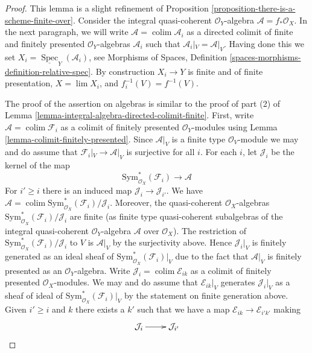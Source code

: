 \documentclass{stacks-project}
\theoremstyle{plain}
\theoremstyle{definition}
\theoremstyle{remark}
\numberwithin{equation}{subsection}
\def\lim{\mathop{\mathrm{lim}}\nolimits}
\def\colim{\mathop{\mathrm{colim}}\nolimits}
\def\Spec{\mathop{\mathrm{Spec}}}
\begin{document}
\begin{proof}
This lemma is a slight refinement of Proposition
\ref{proposition-there-is-a-scheme-finite-over}.
Consider the integral quasi-coherent $\mathcal{O}_Y$-algebra
$\mathcal{A} = f_*\mathcal{O}_X$. In the next paragraph, we will
write $\mathcal{A} = \colim \mathcal{A}_i$ as a directed
colimit of finite and finitely presented $\mathcal{O}_Y$-algebras
$\mathcal{A}_i$ such that $\mathcal{A}_i|_V = \mathcal{A}|_V$.
Having done this we set $X_i = \underline{\Spec}_Y(\mathcal{A}_i)$, see
Morphisms of Spaces, Definition
\ref{spaces-morphisms-definition-relative-spec}.
By construction $X_i \to Y$ is finite and of finite presentation,
$X = \lim X_i$, and $f_i^{-1}(V) = f^{-1}(V)$.

\medskip\noindent
The proof of the assertion on algebras is similar to
the proof of part (2) of
Lemma \ref{lemma-integral-algebra-directed-colimit-finite}.
First, write $\mathcal{A} = \colim \mathcal{F}_i$
as a colimit of finitely presented $\mathcal{O}_Y$-modules using
Lemma \ref{lemma-colimit-finitely-presented}.
Since $\mathcal{A}|_V$ is a finite type $\mathcal{O}_V$-module
we may and do assume that $\mathcal{F}_i|_V \to \mathcal{A}|_V$
is surjective for all $i$.
For each $i$, let $\mathcal{J}_i$ be the kernel of the map
$$
\text{Sym}^*_{\mathcal{O}_X}(\mathcal{F}_i) \longrightarrow \mathcal{A}
$$
For $i' \geq i$ there is an induced map $\mathcal{J}_i \to \mathcal{J}_{i'}$.
We have $\mathcal{A} =
\colim \text{Sym}^*_{\mathcal{O}_X}(\mathcal{F}_i)/\mathcal{J}_i$.
Moreover, the quasi-coherent $\mathcal{O}_X$-algebras
$\text{Sym}^*_{\mathcal{O}_X}(\mathcal{F}_i)/\mathcal{J}_i$
are finite (as finite type quasi-coherent subalgebras of the integral
quasi-coherent $\mathcal{O}_Y$-algebra $\mathcal{A}$ over $\mathcal{O}_X$).
The restriction of $\text{Sym}^*_{\mathcal{O}_X}(\mathcal{F}_i)/\mathcal{J}_i$
to $V$ is $\mathcal{A}|_V$ by the surjectivity above.
Hence $\mathcal{J}_i|_V$ is finitely generated as an ideal sheaf of
$\text{Sym}^*_{\mathcal{O}_X}(\mathcal{F}_i)|_V$ due to the
fact that $\mathcal{A}|_V$ is finitely presented as an
$\mathcal{O}_Y$-algebra.
Write $\mathcal{J}_i = \colim \mathcal{E}_{ik}$
as a colimit of finitely presented $\mathcal{O}_X$-modules.
We may and do assume that $\mathcal{E}_{ik}|_V$
generates $\mathcal{J}_i|_V$ as a sheaf of ideal of
$\text{Sym}^*_{\mathcal{O}_X}(\mathcal{F}_i)|_V$ by the
statement on finite generation above.
Given $i' \geq i$ and $k$ there exists a $k'$ such that we
have a map $\mathcal{E}_{ik} \to \mathcal{E}_{i'k'}$
making
$$
\xymatrix{
\mathcal{J}_i \ar[r] & \mathcal{J}_{i'} \\
}$$
\end{proof}
\end{document}
